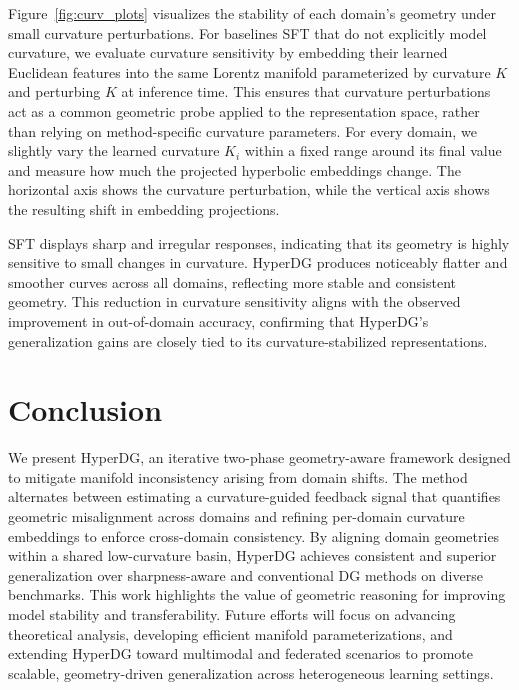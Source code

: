 \documentclass[10pt]{article} %
\begin{document}
Figure~\ref{fig:curv_plots} visualizes the stability of each domain's geometry
under small curvature perturbations. For baselines SFT that do not explicitly model curvature,
we evaluate curvature sensitivity by embedding their learned Euclidean features
into the same Lorentz manifold parameterized by curvature $K$ and perturbing $K$
at inference time. This ensures that curvature perturbations act as a common
geometric probe applied to the representation space, rather than relying on
method-specific curvature parameters.
For every domain, we slightly vary the
learned curvature $K_i$ within a fixed range around its final value and measure
how much the projected hyperbolic embeddings change. The horizontal axis shows
the curvature perturbation, while the vertical axis shows the resulting shift in
embedding projections.

SFT displays sharp and irregular responses, indicating that its geometry is
highly sensitive to small changes in curvature. HyperDG produces noticeably
flatter and smoother curves across all domains, reflecting more stable and
consistent geometry. This reduction in curvature sensitivity aligns with the
observed improvement in out-of-domain accuracy, confirming that HyperDG’s
generalization gains are closely tied to its curvature-stabilized
representations.




\section{Conclusion}

We present HyperDG, an iterative two-phase geometry-aware framework designed to mitigate manifold inconsistency arising from domain shifts. The method alternates between estimating a curvature-guided feedback signal that quantifies geometric misalignment across domains and refining per-domain curvature embeddings to enforce cross-domain consistency. By aligning domain geometries within a shared low-curvature basin, HyperDG achieves consistent and superior generalization over sharpness-aware and conventional DG methods on diverse benchmarks. This work highlights the value of geometric reasoning for improving model stability and transferability. Future efforts will focus on advancing theoretical analysis, developing efficient manifold parameterizations, and extending HyperDG toward multimodal and federated scenarios to promote scalable, geometry-driven generalization across heterogeneous learning settings.



\end{document}
